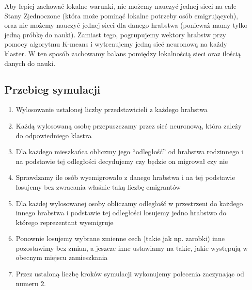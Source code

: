 \documentclass[a4paper,12pt]{article}
\begin{document}
Aby lepiej zachować lokalne warunki, nie możemy nauczyć jednej sieci na całe Stany Zjednoczone (która może pominąć lokalne potrzeby osób emigrujących), oraz nie możemy nauczyć jednej sieci dla danego hrabstwa (ponieważ mamy tylko jedną próbkę do nauki). Zamiast tego, pogrupujemy wektory hrabstw przy pomocy algorytmu K-means i wytrenujemy jedną sieć neuronową na każdy klaster. W ten sposób zachowamy balans pomiędzy lokalnością sieci oraz ilością danych do nauki.

\subsection*{Przebieg symulacji}
\begin{enumerate}
    \item Wylosowanie ustalonej liczby przedstawicieli z każdego hrabstwa
    \item Każdą wylosowaną osobę przepuszczamy przez sieć neuronową, która zależy do odpowiedniego klastra
    \item Dla każdego mieszkańca obliczmy jego ``odległość'' od hrabstwa rodzinnego i na podstawie tej odległości decydujemy czy będzie on migrował czy nie
    \item Sprawdzamy ile osób wyemigrowało z danego hrabstwa i na tej podstawie losujemy bez zwracania właśnie taką liczbę emigrantów
    \item Dla każdej wylosowanej osoby obliczamy odległość w przestrzeni do każdego innego hrabstwa i podstawie tej odległości losujemy jedno hrabstwo do którego reprezentant wyemigruje
    \item Ponownie losujemy wybrane zmienne cech (takie jak np. zarobki) inne pozostawimy bez zmian, a jeszcze inne ustawiamy na takie, jakie występują w obecnym miejscu zamieszkania
    \item Przez ustaloną liczbę kroków symulacji wykonujemy polecenia zaczynając od numeru 2.
\end{enumerate}
\end{document}
